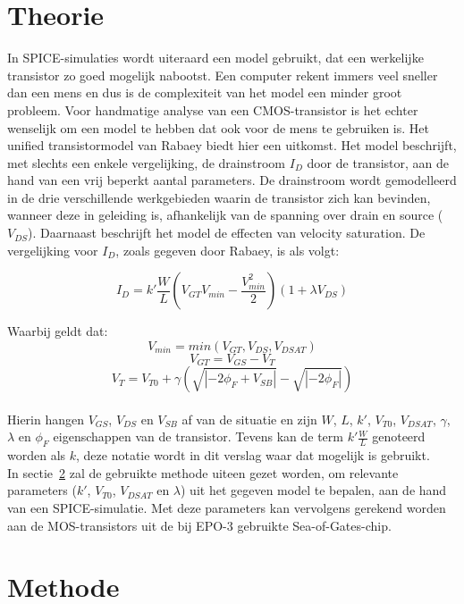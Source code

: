 \documentclass{scrartcl}
\begin{document}
\section{Theorie}
\label{sec:ump-theorie}
In SPICE-simulaties wordt uiteraard een model gebruikt, dat een werkelijke transistor zo goed mogelijk nabootst. Een computer rekent immers veel sneller dan een mens en dus is de complexiteit van het model een minder groot probleem. Voor handmatige analyse van een CMOS-transistor is het echter wenselijk om een model te hebben dat ook voor de mens te gebruiken is.
Het unified transistormodel van Rabaey biedt hier een uitkomst. Het model beschrijft, met slechts een enkele vergelijking, de drainstroom $I_{D}$ door de transistor, aan de hand van een vrij beperkt aantal parameters. De drainstroom wordt gemodelleerd in de drie verschillende werkgebieden waarin de transistor zich kan bevinden, wanneer deze in geleiding is, afhankelijk van de spanning over drain en source ($V_{DS}$). Daarnaast beschrijft het model de effecten van velocity saturation.
De vergelijking voor $I_{D}$, zoals gegeven door Rabaey, is als volgt:

\begin{equation} \label{eq:ump-cmos-model-rab}
	I_{D} = k' \frac{W}{L} (V_{GT}V_{min} - \frac{V_{min}^2}{2})(1 + \lambda V_{DS})	
\end{equation}

Waarbij geldt dat: \\
$$V_{min} = min(V_{GT}, V_{DS}, V_{DSAT})$$
$$V_{GT} = V_{GS} - V_{T}$$
$$V_{T} = V_{T0} + \gamma ( \sqrt{|-2\phi_{F} + V_{SB}|} - \sqrt{|-2\phi_{F}|} )$$
\cite[101]{rabaey-integrated-circuits}\\

Hierin hangen $V_{GS}$, $V_{DS}$ en $V_{SB}$ af van de situatie en zijn $W$, $L$, $k'$, $V_{T0}$, $V_{DSAT}$, $\gamma$, $\lambda$ en $\phi_{F}$ eigenschappen van de transistor. Tevens kan de term $k' \frac{W}{L}$ genoteerd worden als $k$, deze notatie wordt in dit verslag waar dat mogelijk is gebruikt.
\\

In sectie~\ref{sec:ump-methode} zal de gebruikte methode uiteen gezet worden, om relevante parameters ($k'$, $V_{T0}$, $V_{DSAT}$ en $\lambda$) uit het gegeven model te bepalen, aan de hand van een SPICE-simulatie. Met deze parameters kan vervolgens gerekend worden aan de MOS-transistors uit de bij EPO-3 gebruikte Sea-of-Gates-chip.

\section{Methode}
\label{sec:ump-methode}
\end{document}

